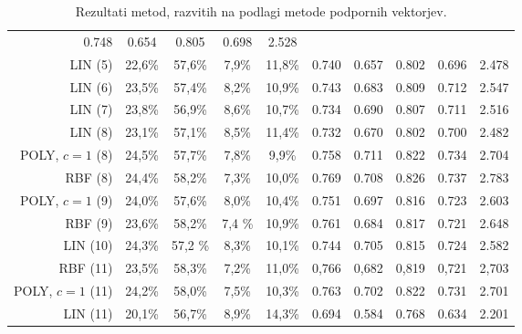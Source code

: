 \documentclass[11pt,a4paper,openany]{book}
\begin{document}
\begin{table}[h!]
\begin{tabular}{r|cccc|cccc|c}
			0.748 & 0.654 & 0.805 & 0.698 &
			2.528 \\
		LIN (5) & 22,6\% & 57,6\% & 7,9\% & 11,8\% &
			0.740 & 0.657 & 0.802 & 0.696 &
			2.478 \\
		LIN (6) & 23,5\% & 57,4\% & 8,2\% & 10,9\% &
			0.743 & 0.683 & 0.809 & 0.712 & 
			2.547 \\
		LIN (7) & 23,8\% & 56,9\% & 8,6\% & 10,7\% &
			0.734 & 0.690 & 0.807 & 0.711 & 
			2.516 \\
		LIN (8) & 23,1\% & 57,1\%&  8,5\% & 11,4\% &
			0.732 & 0.670 & 0.802 & 0.700 &
			2.482 \\
		POLY, $c=1$ (8) & 24,5\% & 57,7\% & 7,8\% & 9,9\% &
			0.758 & 0.711 & 0.822 & 0.734 &
			2.704 \\
		RBF (8) & 24,4\% & 58,2\% & 7,3\% & 10,0\% &
			0.769 & 0.708 & 0.826 & 0.737 &
			2.783 \\			
		POLY, $c=1$ (9) & 24,0\% & 57,6\% & 8,0\% & 10,4\% &
			0.751 & 0.697 & 0.816 & 0.723 &
			2.603 \\
		RBF (9) & 23,6\% & 58,2\% & 7,4 \% & 10,9\% &
			0.761 & 0.684 & 0.817 & 0.721 &
			2.648 \\
		LIN (10) & 24,3\% & 57,2 \% & 8,3\% & 10,1\% &
			0.744 & 0.705 & 0.815 & 0.724 &
			2.582 \\
		RBF (11) & 23,5\% & 58,3\% & 7,2\% & 11,0\% &
			0,766 & 0,682 & 0,819 & 0,721 &
			2,703 \\
		POLY, $c=1$ (11) & 24,2\% & 58,0\% & 7,5\% & 10,3\% &
			0.763 & 0.702 & 0.822 & 0.731 &
			2.701 \\
		LIN (11) & 20,1\% & 56,7\% & 8,9\% & 14,3\% &
			0.694 & 0.584 & 0.768 & 0.634 &
			2.201 \\
			
	\end{tabular}
	\caption{Rezultati metod, razvitih na podlagi metode podpornih vektorjev.}
	\label{tb:svm}
\end{table}
\end{document}
